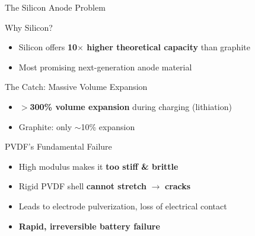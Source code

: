 \documentclass[aspectratio=169]{beamer}
\begin{document}
\begin{frame}{The Silicon Anode Problem}
    \begin{alertblock}{Why Silicon?}
        \begin{itemize}
            \item Silicon offers \textbf{10$\times$ higher theoretical capacity} than graphite
            \item Most promising next-generation anode material
        \end{itemize}
    \end{alertblock}
    
    \begin{alertblock}{The Catch: Massive Volume Expansion}
        \begin{itemize}
            \item \textbf{$>$300\% volume expansion} during charging (lithiation)
            \item Graphite: only $\sim$10\% expansion
        \end{itemize}
    \end{alertblock}
    
    \begin{block}{PVDF's Fundamental Failure}
        \begin{itemize}
            \item High modulus makes it \textbf{too stiff \& brittle}
            \item Rigid PVDF shell \textbf{cannot stretch} $\rightarrow$ \textbf{cracks}
            \item Leads to electrode pulverization, loss of electrical contact
            \item \textbf{Rapid, irreversible battery failure}
        \end{itemize}
    \end{block}
\end{frame}
\end{document}
